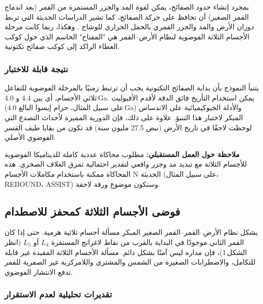 \documentclass[11pt,a4paper]{article}
\begin{document}
	بمجرد إنشاء حدود الصفائح، يمكن لقوة المد والجزر المستمرة من القمر (بعد اندماج القمر الصغير) أن تحافظ على حركة الصفائح، كما تشير الدراسات الحديثة التي تربط دوران الأرض والمد والجزر القمري بالحمل الحراري للوشاح \cite{Rampino2021}. وهكذا، ربما كانت مرحلة الأجسام الثلاثة الفوضوية لنظام الأرض–القمر هي "المفتاح" الحاسم الذي حول كوكب الغطاء الراكد إلى كوكب صفائح تكتونية.
	
	\subsubsection{نتيجة قابلة للاختبار}
	
	يتنبأ النموذج بأن بداية الصفائح التكتونية يجب أن ترتبط زمنيًا بالمرحلة الفوضوية للتفاعل ثلاثي الأجسام، أي بين 4.4 و 4.0 Ga. يمكن استخدام التأريخ فائق الدقة لأقدم الأفيوليت (على سبيل المثال، حزام إيسوا البالغ 4.0 Ga) والأدلة الجيوكيميائية على الاندساس المبكر لاختبار هذا التنبؤ. علاوة على ذلك، فإن الدورية المميزة لأحداث التصدع التي لوحظت لاحقًا في تاريخ الأرض (نبض 27.5 مليون سنة) قد تكون من بقايا طيف القسر الفوضوي الأصلي.
	
	\vspace{0.2cm}
	\noindent
	\textbf{ملاحظة حول العمل المستقبلي:} مطلوب محاكاة عددية كاملة للديناميكا الفوضوية للأجسام الثلاثة مع تبديد مد وجزر واقعي لتقدير احتمالية تمزق الغلاف الصخري. هذه المحاكاة ممكنة باستخدام مكاملات الأجسام N الحديثة (على سبيل المثال، REBOUND، ASSIST) وستكون موضوع ورقة لاحقة.
	
	
	\subsection{فوضى الأجسام الثلاثة كمحفز للاصطدام}
	
	يشكل نظام الأرض–القمر–القمر الصغير المبكر مسألة أجسام ثلاثية هرمية.  
	حتى إذا كان القمر الثاني موجودًا في البداية بالقرب من نقاط لاغرانج المستقرة \(L_4\) أو \(L_5\) (انظر الشكل 1)، فإن مداره ليس آمنًا بشكل دائم.  
	مسألة الأجسام الثلاثة المقيدة غير قابلة للتكامل، والاضطرابات الصغيرة من الشمس والمشتري واللامركزية غير الصفرية للقمر تدفع الانتشار الفوضوي.
	
	\subsubsection{تقديرات تحليلية لعدم الاستقرار}
	
\end{document}
